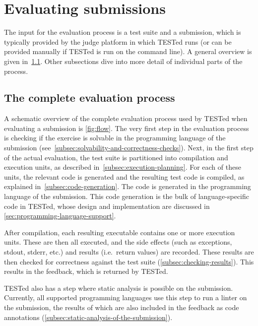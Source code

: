 \documentclass[../main]{subfiles}
\begin{document}
\section{Evaluating submissions}\label{sec:evaluating-submissions}

The input for the evaluation process is a test suite and a submission, which is typically provided by the judge platform in which TESTed runs (or can be provided manually if TESTed is run on the command line).
A general overview is given in~\cref{subsec:evaluation-process}.
Other subsections dive into more detail of individual parts of the process.

\subsection{The complete evaluation process}\label{subsec:evaluation-process}

A schematic overview of the complete evaluation process used by TESTed when evaluating a submission is \cref{fig:flow}.
The very first step in the evaluation process is checking if the exercise is solvable in the programming language of the submission (see~\cref{subsec:solvability-and-correctness-checks}).
Next, in the first step of the actual evaluation, the test suite is partitioned into compilation and execution units, as described in~\cref{subsec:execution-planning}.
For each of these units, the relevant code is generated and the resulting test code is compiled, as explained in~\cref{subsec:code-generation}.
The code is generated in the programming language of the submission.
This code generation is the bulk of language-specific code in TESTed, whose design and implementation are discussed in \cref{sec:programming-language-support}.

After compilation, each resulting executable contains one or more execution units.
These are then all executed, and the side effects (such as exceptions, stdout, stderr, etc.) and results (i.e.\ return values) are recorded.
These results are then checked for correctness against the test suite (\cref{subsec:checking-results}).
This results in the feedback, which is returned by TESTed.

TESTed also has a step where static analysis is possible on the submission.
Currently, all supported programming languages use this step to run a linter on the submission, the results of which are also included in the feedback as code annotations (\cref{subsec:static-analysis-of-the-submission}).
\end{document}
